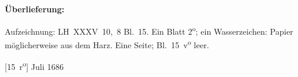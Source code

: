 %
%
%
%
%
\frenchspacing%
%
\begin{ledgroupsized}[r]{120mm}
\footnotesize
\pstart
\noindent\textbf{Überlieferung:}
\pend
\end{ledgroupsized}
\begin{ledgroupsized}[r]{114mm}
\footnotesize
\pstart \parindent -6mm
%
Aufzeichnung: LH~XXXV~10,~8 Bl.~15.
Ein Blatt 2\textsuperscript{o};
ein Wasserzeichen: Papier möglicherweise aus dem Harz.
Eine Seite;
Bl.~15~v\textsuperscript{o} leer.
\pend
\end{ledgroupsized}
%
%
%
\frenchspacing%
%
%
\vspace{8mm}%
%
\count{}
%
\count{}
\count{}
%
\pstart%
\noindent%
\normalsize%
%
[15~r\textsuperscript{o}] %
%
Juli 1686
\pend%
\vspace{0.5em}
%
%
%
%
\pstart%
\noindent%
